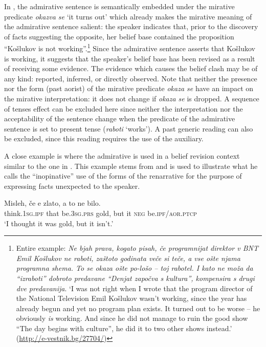 \documentclass[output=paper]{langscibook}
\begin{document}
\noindent In , the admirative sentence is semantically embedded under the mirative predicate \textit{okazva se} `it turns out' which already makes the mirative meaning of the admirative sentence salient: the speaker indicates that, prior to the discovery of facts suggesting the opposite, her belief base contained the proposition ``Košlukov is not working''.\footnote{Entire example: \textit{Ne bjah prava, kogato pisah, če programnijat direktor v BNT Emil Košlukov ne raboti, zaštoto godinata veče si teče, a vse ošte njama programna shema. To se okaza ošte po-lošo -- toj rabotel. I kato ne moža da ``izraboti'' dobroto predavane ``Denjat započva s kultura'', kompensira s drugi dve predavanija}.
`I was not right when I wrote that the program director of the  National Television Emil Košlukov wasn't working, since the year has already begun and yet no program plan exists. It turned out to be worse -- he obviously \emph{is} working. And since he did not manage to ruin the good show ``The day begins with culture'', he did it to two other shows instead.' \hfill (\url{http://e-vestnik.bg/27704/})} Since the admirative sentence asserts that Košlukov is working, it suggests that the speaker's belief base has been revised as a result of receiving some evidence. The evidence which causes the belief clash may be of any kind: reported, inferred, or directly observed. Note that neither the presence nor the form (past aorist) of the mirative predicate \textit{okaza se} have an impact on the mirative interpretation: it does not change if \textit{okaza se} is dropped. A sequence of tenses effect can be excluded here since neither the interpretation nor the acceptability of the sentence change when the predicate of the admirative sentence is set to present tense (\textit{raboti} `works'). A past generic reading can also be excluded, since this reading requires the use of the auxiliary. %

A close example is  where the admirative is used in a belief revision context similar to the one in . This example stems from \citet[68]{Andrejcin1938} and is used to illustrate what he calls the ``inopinative'' use of the forms of the renarrative for the purpose of expressing facts unexpected to the speaker.

\ea \label{ex:misleh}
\gll Misleh, če e zlato, a to ne bilo.\\
think.\textsc{1sg.ipf} that be.\textsc{3sg.prs} gold, but it \textsc{neg} be.\textsc{ipf/aor.ptcp} \\
\glt `I thought it was gold, but it isn't.'
\z
\end{document}
